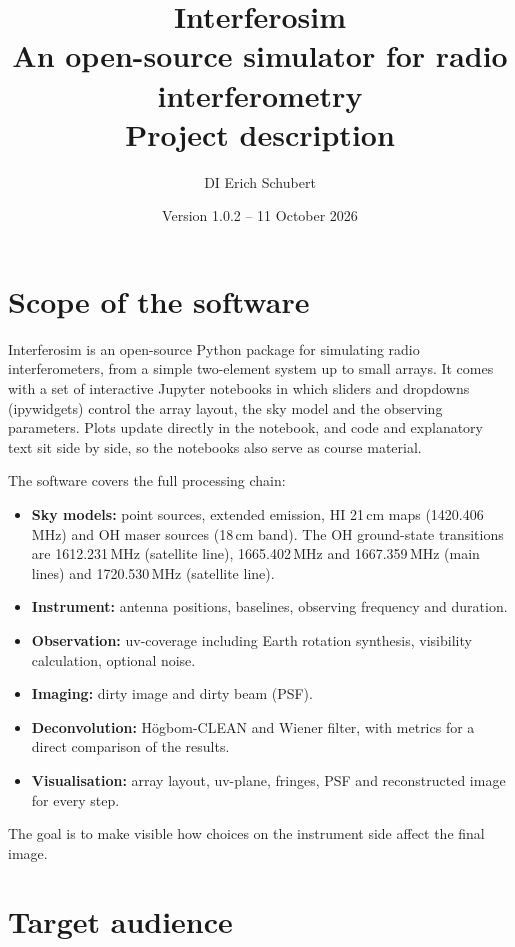 \documentclass[11pt,a4paper]{article}
\title{\textbf{Interferosim}\\[0.3em]
\large An open-source simulator for radio interferometry\\
Project description}
\author{DI Erich Schubert}
\date{Version 1.0.2 -- 11 October 2026}
\begin{document}
\maketitle

\section{Scope of the software}

Interferosim is an open-source Python package for simulating radio
interferometers, from a simple two-element system up to small arrays.
It comes with a set of interactive Jupyter notebooks in which sliders
and dropdowns (ipywidgets) control the array layout, the sky model and
the observing parameters. Plots update directly in the notebook, and
code and explanatory text sit side by side, so the notebooks also serve
as course material.

The software covers the full processing chain:

\begin{itemize}[noitemsep]
  \item \textbf{Sky models:} point sources, extended emission,
        HI 21\,cm maps (1420.406\,MHz) and OH maser sources
        (18\,cm band). The OH ground-state transitions are
        1612.231\,MHz (satellite line), 1665.402\,MHz and
        1667.359\,MHz (main lines) and 1720.530\,MHz (satellite line).
  \item \textbf{Instrument:} antenna positions, baselines, observing
        frequency and duration.
  \item \textbf{Observation:} uv-coverage including Earth rotation
        synthesis, visibility calculation, optional noise.
  \item \textbf{Imaging:} dirty image and dirty beam (PSF).
  \item \textbf{Deconvolution:} Högbom-CLEAN and Wiener filter, with
        metrics for a direct comparison of the results.
  \item \textbf{Visualisation:} array layout, uv-plane, fringes, PSF
        and reconstructed image for every step.
\end{itemize}

The goal is to make visible how choices on the instrument side affect
the final image.

\section{Target audience}
\end{document}
